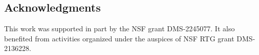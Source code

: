 \documentclass[12pt, oneside, reqno]{amsart}
\theoremstyle{remark}
\begin{document}



\subsection*{Acknowledgments}

This work was supported in part by the NSF grant DMS-2245077. %
It also benefited from activities organized under the auspices of NSF
RTG grant DMS-2136228.

\newpage 



\end{document}
